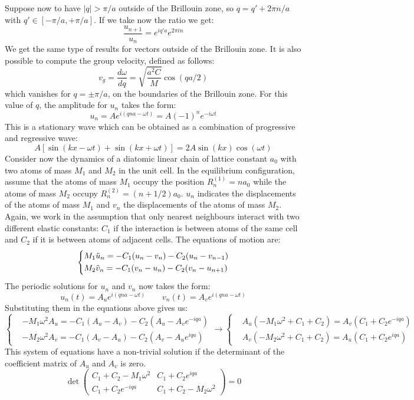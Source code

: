 \documentclass[10.75pt,a4paper,openright,bottom=2cm]{article}
\begin{document}
Suppose now to have $|q|>\pi/a$ outside of the  Brillouin zone, so $q=q'+2\pi n/a$ with $q'\in[-\pi/a,+\pi/a]$. If we take now the ratio we get:
\[
\frac{u_{n+1}}{u_n}=e^{iq'a}e^{2\pi in}
\]
We get the same type of results for vectors outside of the  Brillouin zone. It is also possible to compute the group velocity, defined as follows:
\[
v_g=\frac{d\omega}{dq}=\sqrt{\frac{a^2C}{M}}\cos(qa/2)
\]
which vanishes for $q=\pm\pi/a$, on the boundaries of the  Brillouin zone. For this value of $q$, the amplitude for $u_n$ takes the form:
\[
u_n=Ae^{i(qna-\omega t)}=A(-1)^ne^{-i\omega t}
\]
This is a stationary wave which can be obtained as a combination of progressive and regressive wave:
\[
A[\sin(kx-\omega t)+\sin(kx+\omega t)]=2A\sin(kx)\cos(\omega t)
\]
Consider now the dynamics of a diatomic linear chain of lattice constant $a_0$ with two atoms of mass $M_1$ and $M_2$ in the unit cell. In the equilibrium configuration, assume that the atoms of mass $M_1$ occupy the position $R_n^{(1)}=na_0$ while the atoms of mass $M_2$ occupy $R_n^{(2)}=(n+1/2)a_0$. $u_n$ indicates the displacements of the atoms of mass $M_1$ and $v_n$ the displacements of the atoms of mass $M_2$. Again, we work in the assumption that only nearest neighbours interact with two different elastic constants: $C_1$ if the interaction is between atoms of the same cell and $C_2$ if it is between atoms of adjacent cells. The equations of motion are:
\[
\left\{
\begin{aligned}
&M_1\Ddot{u}_n=-C_1(u_n-v_n)-C_2(u_n-v_{n-1})\\
&M_2\Ddot{v}_n=-C_1(v_n-u_n)-C_2(v_n-u_{n+1})
\end{aligned}
\right.
\]
The periodic solutions for $u_n$ and $v_n$ now takes the form:
\[
u_n(t)=A_ue^{i(qna-\omega t)} \qquad v_n(t)=A_ve^{i(qna-\omega t)}
\]
Substituting them in the equations above gives us:
\[
\left\{
\begin{aligned}
&-M_1\omega^2A_u=-C_1(A_u-A_v)-C_2(A_u-A_ve^{-iqa})\\
&-M_2\omega^2A_v=-C_1(A_v-A_u)-C_2(A_v-A_ue^{iqa})
\end{aligned}
\right.
\to
\left\{
\begin{aligned}
&A_u(-M_1\omega^2+C_1+C_2)=A_v(C_1+C_2e^{-iqa})\\
&A_v(-M_2\omega^2+C_1+C_2)=A_u(C_1+C_2e^{iqa})
\end{aligned}
\right.
\]
This system of equations have a non-trivial solution if the determinant of the coefficient matrix of $A_u$ and $A_v$ is zero.
\[
\det\left(\begin{array}{cc}
    C_1+C_2-M_1\omega^2 & C_1+C_2e^{iqa} \\
    C_1+C_2e^{-iqa} & C_1+C_2-M_2\omega^2
\end{array}\right)=0
\]
\end{document}
